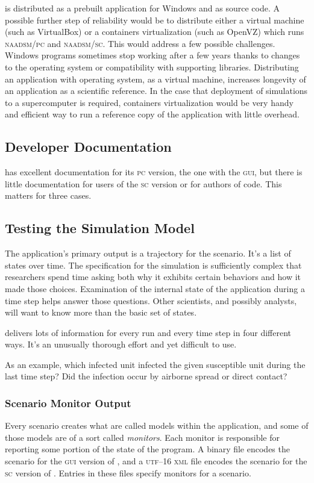 \documentclass{article}
\begin{document}
\naadsm is distributed as a prebuilt application for Windows
and as source code. A possible further step of reliability would
be to distribute either a virtual machine (such as VirtualBox)
or a containers virtualization (such as OpenVZ) which runs
\textsc{naadsm/pc} and \textsc{naadsm/sc}.
This would address a few possible challenges. Windows programs
sometimes stop working after a few years thanks to changes to
the operating system or compatibility with supporting libraries.
Distributing an application with operating system, as
a virtual machine, increases
longevity of an application as a scientific reference.
In the case that deployment of simulations to a supercomputer
is required, containers virtualization would be very handy
and efficient way to run a reference copy of the application
with little overhead.


\subsection{Developer Documentation}
\naadsm has excellent documentation for its \textsc{pc} version,
the one with the \textsc{gui}, but there is little documentation
for users of the \textsc{sc} version or for authors of code.
This matters for three cases.

\subsection{Testing the Simulation Model}
The application's primary output is a trajectory for the
scenario. It's a list of states over time. The specification
for the simulation is sufficiently complex that researchers
spend time asking both why it exhibits certain behaviors
and how it made those choices. Examination of the internal
state of the application during a time step helps answer those
questions. Other scientists, and possibly analysts, will want
to know more than the basic set of states.

\naadsm delivers lots of information for every run and every time
step in four different ways. It's an unusually thorough effort
and yet difficult to use.

As an example, which infected unit infected the given
susceptible unit during the last time step? Did the
infection occur by airborne spread or direct contact?


\subsubsection{Scenario Monitor Output}
Every \naadsm scenario creates what are called models within
the application, and some of those models are of a sort
called \emph{monitors}. Each monitor is responsible
for reporting some portion of the state of the program.
A binary file encodes the scenario for the \textsc{gui}
version of \naadsm, and a \textsc{utf--16} \textsc{xml}
file encodes the scenario for the \textsc{sc} version
of \naadsm. Entries in these files specify monitors
for a scenario.
\end{document}
